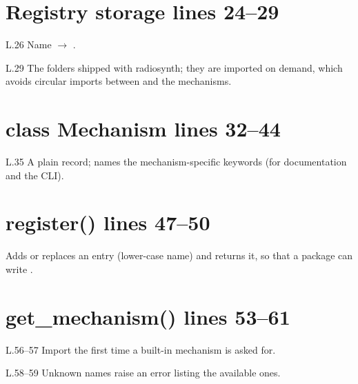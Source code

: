 \section*{\normalsize Registry storage \hfill{\small\mdseries\color{gray}lines 24--29}}

\begin{lines}
\item[L.26] Name $\to$ .
\item[L.29] The folders shipped with radiosynth; they are imported on demand, which avoids circular imports between  and the mechanisms.
\end{lines}
\section*{\normalsize class Mechanism \hfill{\small\mdseries\color{gray}lines 32--44}}

\begin{lines}
\item[L.35] A plain record;  names the mechanism-specific keywords (for documentation and the CLI).
\end{lines}
\section*{\normalsize register() \hfill{\small\mdseries\color{gray}lines 47--50}}

Adds or replaces an entry (lower-case name) and returns it, so that a package can write .

\section*{\normalsize get\_mechanism() \hfill{\small\mdseries\color{gray}lines 53--61}}

\begin{lines}
\item[L.56–57] Import  the first time a built-in mechanism is asked for.
\item[L.58–59] Unknown names raise an error listing the available ones.
\end{lines}
